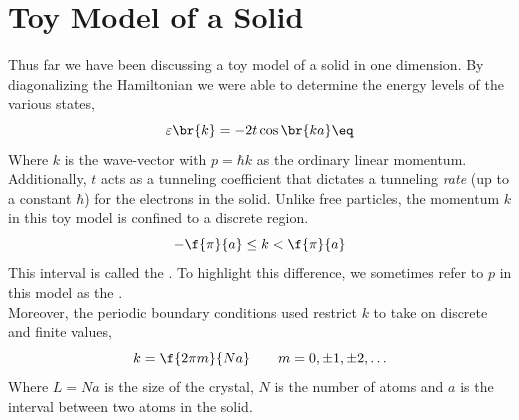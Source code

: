 \documentclass{article}
\begin{document}
\titlePage

\tableOfContents

\disclaimer

\section{Toy Model of a Solid}


\begin{center}
\end{center}


Thus far we have been discussing a toy model of a solid in one dimension. By diagonalizing the Hamiltonian we were able to determine the energy levels of the various states,
\[ \varepsilon\br{k} = - 2 t \cos\br{ka} \eq \label{eq:single_energy__band}\]
Where $k$ is the wave-vector with $p = \hbar k$ as the ordinary linear momentum. Additionally, $t$ acts as a tunneling coefficient that dictates a tunneling \textit{rate} (up to a constant $\hbar$) for the electrons in the solid. Unlike free particles, the momentum $k$ in this toy model is confined to a discrete region.
\[ -\f{\pi}{a} \leq k < \f{\pi}{a} \]
This interval is called the .
To highlight this difference, we sometimes refer to $p$ in this model as the .\\

Moreover, the periodic boundary conditions used restrict $k$ to take on discrete and finite values,
\[ k = \f{2 \pi m}{Na} \qquad m = 0, \pm 1, \pm 2, \ldots \]
Where $L = Na$ is the size of the crystal, $N$ is the number of atoms and $a$ is the interval between two atoms in the solid.\\
\end{document}

